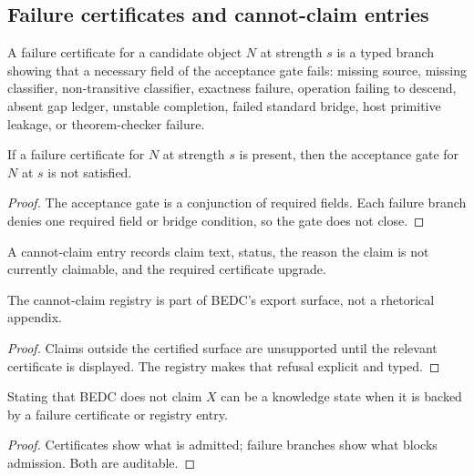 \subsection{Failure certificates and cannot-claim entries}
\label{subsec:philosophy-failure-cannot-claim}

\begin{definition}
\label{def:philosophy-failure-certificate}
A failure certificate for a candidate object \(N\) at strength \(s\)
is a typed branch showing that a necessary field of the acceptance gate
fails: missing source, missing classifier, non-transitive classifier,
exactness failure, operation failing to descend, absent gap ledger,
unstable completion, failed standard bridge, host primitive leakage, or
theorem-checker failure.
\end{definition}

\begin{theorem}
\label{thm:philosophy-failure-blocks-acceptance}
If a failure certificate for \(N\) at strength \(s\) is present, then
the acceptance gate for \(N\) at \(s\) is not satisfied.
\end{theorem}
\begin{proof}
The acceptance gate is a conjunction of required fields. Each failure
branch denies one required field or bridge condition, so the gate does
not close.
\end{proof}

\begin{definition}
\label{def:philosophy-cannot-claim-entry}
A cannot-claim entry records claim text, status, the reason the claim
is not currently claimable, and the required certificate upgrade.
\end{definition}

\begin{theorem}
\label{thm:philosophy-cannot-claim-export-discipline}
The cannot-claim registry is part of BEDC's export surface, not a
rhetorical appendix.
\end{theorem}
\begin{proof}
Claims outside the certified surface are unsupported until the relevant
certificate is displayed. The registry makes that refusal explicit and
typed.
\end{proof}

\begin{corollary}
\label{cor:philosophy-negative-export-knowledge}
Stating that BEDC does not claim \(X\) can be a knowledge state when it
is backed by a failure certificate or registry entry.
\end{corollary}
\begin{proof}
Certificates show what is admitted; failure branches show what blocks
admission. Both are auditable.
\end{proof}

